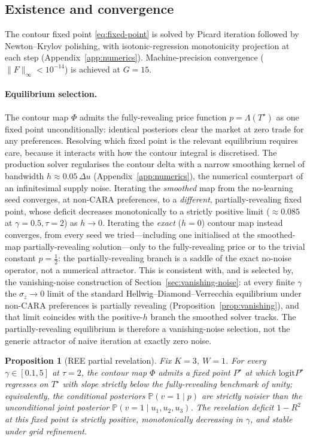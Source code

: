 \documentclass[12pt,letterpaper]{article}
\newtheorem{proposition}{Proposition}
\theoremstyle{definition}
\theoremstyle{remark}
\newcommand{\PP}{\mathbb{P}}
\newcommand{\Lam}{\Lambda}            %
\newcommand{\logit}{\mathrm{logit}}
\newcommand{\Tstar}{T^{\!\star}}
\newcommand{\1}{\mathbf{1}}
\begin{document}
\subsection{Existence and convergence}\label{sec:convergence}

The contour fixed point \eqref{eq:fixed-point} is solved by Picard
iteration followed by Newton--Krylov polishing, with isotonic-regression
monotonicity projection at each step (Appendix~\ref{app:numerics}).
Machine-precision convergence ($\|F\|_{\infty}<10^{-14}$) is achieved
at $G=15$.

\paragraph{Equilibrium selection.}
The contour map $\Phi$ admits the fully-revealing price function
$p=\Lam(\Tstar)$ as one fixed point unconditionally: identical posteriors
clear the market at zero trade for any preferences. Resolving which
fixed point is the relevant equilibrium requires care, because it
interacts with how the contour integral is discretised. The production
solver regularises the contour delta with a narrow smoothing kernel of
bandwidth $h\!\approx\!0.05\,\Delta u$ (Appendix~\ref{app:numerics}),
the numerical counterpart of an infinitesimal supply noise. Iterating the
\emph{smoothed} map from the no-learning seed converges, at non-CARA
preferences, to a \emph{different}, partially-revealing fixed point, whose
deficit decreases monotonically to a strictly positive limit
($\approx0.085$ at $\gamma=0.5,\tau=2$) as $h\to0$. Iterating the
\emph{exact} ($h=0$) contour map instead converges, from every seed we
tried---including one initialised at the smoothed-map partially-revealing
solution---only to the fully-revealing price or to the trivial constant
$p=\tfrac12$: the partially-revealing branch is a saddle of the exact
no-noise operator, not a numerical attractor. This is consistent with,
and is selected by, the vanishing-noise construction of
Section~\ref{sec:vanishing-noise}: at every finite $\gamma$ the
$\sigma_{z}\to0$ limit of the standard Hellwig--Diamond--Verrecchia
equilibrium under non-CARA preferences is partially revealing
(Proposition~\ref{prop:vanishing}), and that limit coincides with the
positive-$h$ branch the smoothed solver tracks. The partially-revealing
equilibrium is therefore a vanishing-noise selection, not the generic
attractor of naive iteration at exactly zero noise.

\begin{proposition}[REE partial revelation]\label{prop:ree}
Fix $K=3$, $W=1$. For every $\gamma\in[0.1,5]$ at $\tau=2$, the contour
map $\Phi$ admits a fixed point $P^{\star}$ at which $\logit P^{\star}$
regresses on $\Tstar$ with slope strictly below the fully-revealing
benchmark of unity; equivalently, the conditional posteriors
$\PP(v=1\mid p)$ are strictly noisier than the unconditional joint
posterior $\PP(v=1\mid u_{1},u_{2},u_{3})$. The revelation deficit
$1-R^{2}$ at this fixed point is strictly positive, monotonically
decreasing in $\gamma$, and stable under grid refinement.
\end{proposition}
\end{document}
